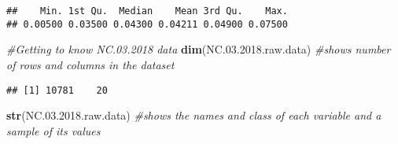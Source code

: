 \documentclass[]{article}
\newenvironment{Shaded}{\begin{snugshade}}{\end{snugshade}}
\newcommand{\KeywordTok}[1]{\textcolor[rgb]{0.13,0.29,0.53}{\textbf{#1}}}
\newcommand{\FloatTok}[1]{\textcolor[rgb]{0.00,0.00,0.81}{#1}}
\newcommand{\CommentTok}[1]{\textcolor[rgb]{0.56,0.35,0.01}{\textit{#1}}}
\newcommand{\NormalTok}[1]{#1}
\begin{document}
\begin{verbatim}
##    Min. 1st Qu.  Median    Mean 3rd Qu.    Max. 
## 0.00500 0.03500 0.04300 0.04211 0.04900 0.07500
\end{verbatim}

\begin{Shaded}
\begin{Highlighting}[]
\CommentTok{#Getting to know NC.03.2018 data}
\KeywordTok{dim}\NormalTok{(NC.}\FloatTok{03.2018}\NormalTok{.raw.data) }\CommentTok{#shows number of rows and columns in the dataset}
\end{Highlighting}
\end{Shaded}

\begin{verbatim}
## [1] 10781    20
\end{verbatim}

\begin{Shaded}
\begin{Highlighting}[]
\KeywordTok{str}\NormalTok{(NC.}\FloatTok{03.2018}\NormalTok{.raw.data) }\CommentTok{#shows the names and class of each variable and a sample of its values}
\end{Highlighting}
\end{Shaded}
\end{document}
